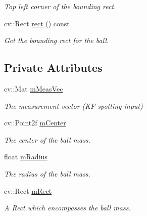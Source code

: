 \begin{DoxyCompactItemize}
\begin{DoxyCompactList}\small\item\em Top left corner of the bounding rect. \end{DoxyCompactList}\item 
cv\+::\+Rect \hyperlink{classTrackingBall_a31cd306342da9739e85613eac24dec08}{rect} () const \hypertarget{classTrackingBall_a31cd306342da9739e85613eac24dec08}{}\label{classTrackingBall_a31cd306342da9739e85613eac24dec08}

\begin{DoxyCompactList}\small\item\em Get the bounding rect for the ball. \end{DoxyCompactList}\end{DoxyCompactItemize}
\subsection*{Private Attributes}
\begin{DoxyCompactItemize}
\item 
cv\+::\+Mat \hyperlink{classTrackingBall_ad4f745f4ca322a75c6963dbabd257437}{m\+Meas\+Vec}\hypertarget{classTrackingBall_ad4f745f4ca322a75c6963dbabd257437}{}\label{classTrackingBall_ad4f745f4ca322a75c6963dbabd257437}

\begin{DoxyCompactList}\small\item\em The measurement vector (KF spotting input) \end{DoxyCompactList}\item 
cv\+::\+Point2f \hyperlink{classTrackingBall_a8afc4e4b68a344e028b1f24722a002d4}{m\+Center}\hypertarget{classTrackingBall_a8afc4e4b68a344e028b1f24722a002d4}{}\label{classTrackingBall_a8afc4e4b68a344e028b1f24722a002d4}

\begin{DoxyCompactList}\small\item\em The center of the ball mass. \end{DoxyCompactList}\item 
float \hyperlink{classTrackingBall_a286b728922e750d4d89a927363ca12b2}{m\+Radius}\hypertarget{classTrackingBall_a286b728922e750d4d89a927363ca12b2}{}\label{classTrackingBall_a286b728922e750d4d89a927363ca12b2}

\begin{DoxyCompactList}\small\item\em The radius of the ball mass. \end{DoxyCompactList}\item 
cv\+::\+Rect \hyperlink{classTrackingBall_ae90649763c0f576331b28035fe6dea56}{m\+Rect}\hypertarget{classTrackingBall_ae90649763c0f576331b28035fe6dea56}{}\label{classTrackingBall_ae90649763c0f576331b28035fe6dea56}

\begin{DoxyCompactList}\small\item\em A Rect which encompasses the ball mass. \end{DoxyCompactList}\end{DoxyCompactItemize}


